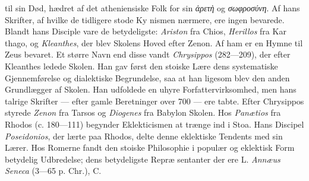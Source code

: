 \documentclass[12pt,a4paper]{book}
\newcommand{\gk}[1]{\textit{#1}}
\begin{document}
til sin Død, hædret af det atheniensiske Folk for sin \gk{ἀρετὴ} og
\gk{σωφροσύνη}. Af hans Skrifter, af hvilke de tidligere stode Ky\-%
nismen nærmere, ere ingen bevarede. Blandt hans Disciple
vare de betydeligste: \emph{Ariston} fra Chios, \emph{Herillos} fra Kar\-%
thago, og \emph{Kleanthes}, der blev Skolens Hoved efter Zenon.
Af ham er en Hymne til Zeus bevaret. Et større Navn end
disse vandt \emph{Chrysippos} (282---209), der efter Kleanthes ledede
Skolen. Han gav først den stoiske Lære dens systematiske
Gjennemførelse og dialektiske Begrundelse, saa at han ligesom
blev den anden Grundlægger af Skolen. Han udfoldede en uhyre
Forfattervirksomhed, men hans talrige Skrifter --- efter gamle
Beretninger over 700 --- ere tabte. Efter Chrysippos styrede
\emph{Zenon} fra Tarsos og \emph{Diogenes} fra Babylon Skolen. Hos
\emph{Panætios} fra Rhodos (c. 180---111) begynder Eklekticismen
at trænge ind i Stoa. Hans Discipel \emph{Poseidonios}, der lærte
paa Rhodos, delte denne eklektiske Tendents med sin Lærer.
Hos Romerne fandt den stoiske Philosophie i populær og
eklektisk Form betydelig Udbredelse; dens betydeligste Repræ\-%
sentanter der ere L. \emph{Annæus Seneca} (3---65 p. Chr.), C.
\end{document}
